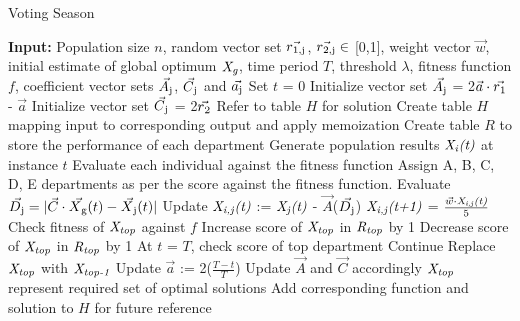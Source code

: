 \documentclass[conference]{IEEEtran}
\begin{document}
\begin{algorithm}[!t]
\footnotesize
\caption{Voting Season}
\label{alg:da}
\begin{algorithmic}[1]
\STATE \textbf{Input:} Population size $\textit{n}$, random vector set $\vec{r\textsubscript{1,j}}$, $\vec{r\textsubscript{2,j}} \in$ [0,1], weight vector $\vec{w}$, initial estimate of global optimum $\textit{X\textsubscript{g}}$, time period $\textit{T}$, threshold $\lambda$, fitness function $\textit{f}$, coefficient vector sets $\vec{A\textsubscript{j}}$, $\vec{C\textsubscript{j}}$ and $\vec{a\textsubscript{j}}$
\STATE Set $\textit{t}$ = 0
\STATE Initialize vector set $\vec{A\textsubscript{j}}$ = 2$\vec{a} \cdot \vec{r\textsubscript{1}}$ - $\vec{a}$
\STATE Initialize vector set $\vec{C\textsubscript{j}}$ = 2$\vec{r\textsubscript{2}}$
\STATE Refer to table $\textit{H}$ for solution
\ELSE
\STATE Create table $\textit{H}$ mapping input to corresponding output and apply memoization
\STATE Create table $\textit{R}$ to store the performance of each department
\STATE Generate population results $\textit{X\textsubscript{i}(t)}$ at instance $\textit{t}$
\STATE Evaluate each individual against the fitness function
\ENDFOR
\STATE Assign A, B, C, D, E departments as per the score against the fitness function. 
\STATE Evaluate $\vec{D\textsubscript{j}} = |\vec{C} \cdot \vec{X\textsubscript{g}}(t) - \vec{X\textsubscript{j}}(t)|$
\STATE Update $\textit{X\textsubscript{i,j}(t)}$ := $\textit{X\textsubscript{j}(t)}$ - $\vec{A}$($\vec{D\textsubscript{j}}$)
\STATE $\textit{X\textsubscript{i,j}(t+1)}$ = $\frac{\vec{w} \cdot \textit{X\textsubscript{i,j}(t)}}{5}$
\ENDFOR
\STATE Check fitness of $\textit{X\textsubscript{top}}$ against $\textit{f}$
\STATE Increase score of $\textit{X\textsubscript{top}}$ in $\textit{R\textsubscript{top}}$ by 1
\ELSE
\STATE Decrease score of $\textit{X\textsubscript{top}}$ in $\textit{R\textsubscript{top}}$ by 1
\ENDIF
\ENDWHILE
\STATE At $\textit{t}$ = $\textit{T}$, check score of top department
\STATE Continue
\ELSE
\STATE Replace $\textit{X\textsubscript{top}}$ with $\textit{X\textsubscript{top-1}}$
\ENDIF
\STATE Update $\vec{a}$ := 2($\frac{T-t}{T}$)
\STATE Update $\vec{A}$ and $\vec{C}$ accordingly
\STATE $\textit{X\textsubscript{top}}$ represent required set of optimal solutions
\STATE Add corresponding function and solution to $\textit{H}$ for future reference
\ENDIF
\end{algorithmic}
\end{algorithm}
\end{document}
